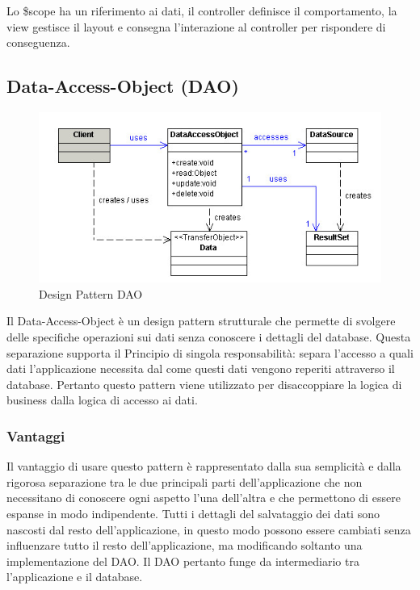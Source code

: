 \documentclass[a4paper, titlepage]{article}
\begin{document}
Lo \$scope ha un riferimento ai dati, il controller definisce il comportamento, la view gestisce il layout e consegna l’interazione al controller per rispondere di conseguenza.

\subsection{Data-Access-Object (DAO)}
\begin{figure}[htp]
\centering
\includegraphics[scale=0.75]{Img/dao.jpg}
\caption{Design Pattern DAO}
\label{}
\end{figure}
Il Data-Access-Object è un design pattern strutturale che permette di svolgere delle specifiche operazioni sui dati senza conoscere i dettagli del database. Questa separazione supporta il Principio di singola responsabilità: separa l'accesso a quali dati l'applicazione necessita dal come questi dati vengono reperiti attraverso il database.
Pertanto questo pattern viene utilizzato per disaccoppiare la logica di business dalla logica di accesso ai dati. 

\subsubsection{Vantaggi}
Il vantaggio di usare questo pattern è rappresentato dalla sua semplicità e dalla rigorosa separazione tra le due principali parti dell'applicazione che non necessitano di conoscere ogni aspetto l'una dell'altra e che permettono di essere espanse in modo indipendente.
Tutti i dettagli del salvataggio dei dati sono nascosti dal resto dell'applicazione, in questo modo possono essere cambiati senza influenzare tutto il resto dell'applicazione, ma modificando soltanto una implementazione del DAO.
\newline Il DAO pertanto funge da intermediario tra l'applicazione e il database.
\end{document}
